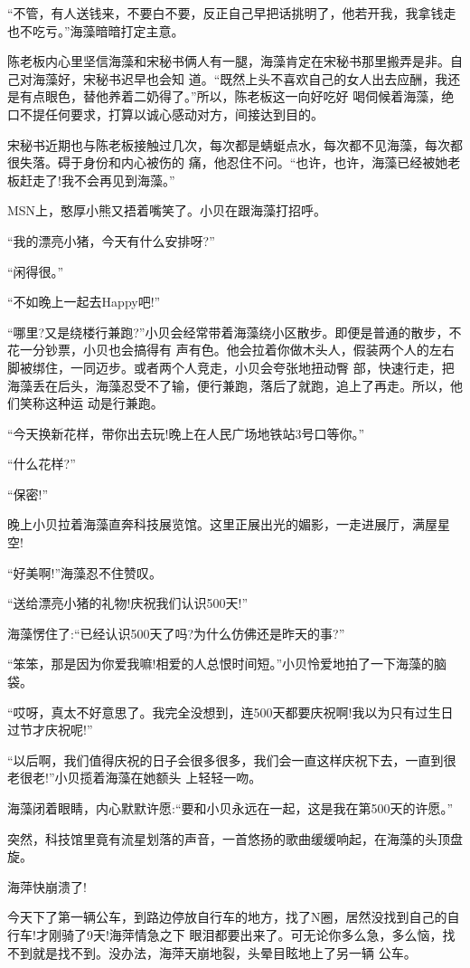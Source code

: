 \documentclass[11pt,a4paper,onecolumn]{article}
\begin{document}
``不管，有人送钱来，不要白不要，反正自己早把话挑明了，他若开我，我拿钱走也不吃亏。''海藻暗暗打定主意。

陈老板内心里坚信海藻和宋秘书俩人有一腿，海藻肯定在宋秘书那里搬弄是非。自己对海藻好，宋秘书迟早也会知
道。``既然上头不喜欢自己的女人出去应酬，我还是有点眼色，替他养着二奶得了。''所以，陈老板这一向好吃好
喝伺候着海藻，绝口不提任何要求，打算以诚心感动对方，间接达到目的。

宋秘书近期也与陈老板接触过几次，每次都是蜻蜓点水，每次都不见海藻，每次都很失落。碍于身份和内心被伤的
痛，他忍住不问。``也许，也许，海藻已经被她老板赶走了!我不会再见到海藻。''

MSN上，憨厚小熊又捂着嘴笑了。小贝在跟海藻打招呼。

``我的漂亮小猪，今天有什么安排呀?''

``闲得很。''

``不如晚上一起去Happy吧!''

``哪里?又是绕楼行兼跑?''小贝会经常带着海藻绕小区散步。即便是普通的散步，不花一分钞票，小贝也会搞得有
声有色。他会拉着你做木头人，假装两个人的左右脚被绑住，一同迈步。或者两个人竞走，小贝会夸张地扭动臀
部，快速行走，把海藻丢在后头，海藻忍受不了输，便行兼跑，落后了就跑，追上了再走。所以，他们笑称这种运
动是行兼跑。

``今天换新花样，带你出去玩!晚上在人民广场地铁站3号口等你。''

``什么花样?''

``保密!''

晚上小贝拉着海藻直奔科技展览馆。这里正展出光的媚影，一走进展厅，满屋星空!

``好美啊!''海藻忍不住赞叹。

``送给漂亮小猪的礼物!庆祝我们认识500天!''

海藻愣住了:``已经认识500天了吗?为什么仿佛还是昨天的事?''

``笨笨，那是因为你爱我嘛!相爱的人总恨时间短。''小贝怜爱地拍了一下海藻的脑袋。

``哎呀，真太不好意思了。我完全没想到，连500天都要庆祝啊!我以为只有过生日过节才庆祝呢!''

``以后啊，我们值得庆祝的日子会很多很多，我们会一直这样庆祝下去，一直到很老很老!''小贝揽着海藻在她额头
上轻轻一吻。

海藻闭着眼睛，内心默默许愿:``要和小贝永远在一起，这是我在第500天的许愿。''

突然，科技馆里竟有流星划落的声音，一首悠扬的歌曲缓缓响起，在海藻的头顶盘旋。

海萍快崩溃了!

今天下了第一辆公车，到路边停放自行车的地方，找了N圈，居然没找到自己的自行车!才刚骑了9天!海萍情急之下
眼泪都要出来了。可无论你多么急，多么恼，找不到就是找不到。没办法，海萍天崩地裂，头晕目眩地上了另一辆
公车。
\end{document}
